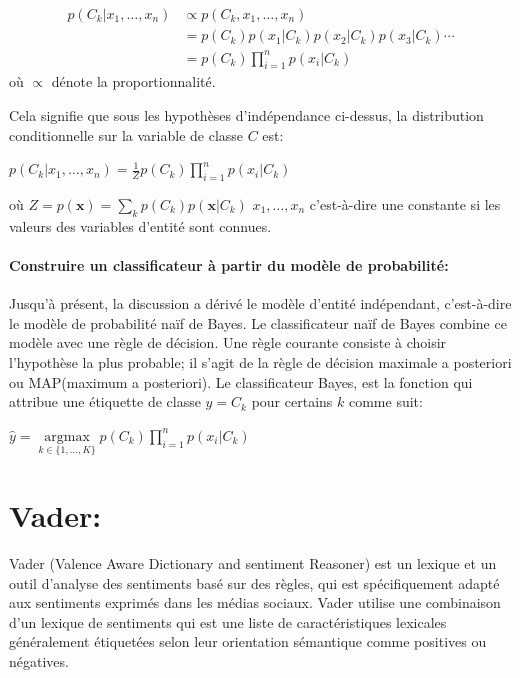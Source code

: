 \begin{equation}
    \begin{aligned}
        p\left(C_{k} | x_{1}, \ldots, x_{n}\right) & \propto p\left(C_{k}, x_{1}, \ldots, x_{n}\right)                                                               \\
                                                   & =p\left(C_{k}\right) p\left(x_{1} | C_{k}\right) p\left(x_{2} | C_{k}\right) p\left(x_{3} | C_{k}\right) \cdots \\
                                                   & =p\left(C_{k}\right) \prod_{i=1}^{n} p\left(x_{i} | C_{k}\right)
    \end{aligned}
\end{equation}
où $\propto$ dénote la proportionnalité.

Cela signifie que sous les hypothèses d'indépendance ci-dessus, la distribution conditionnelle sur la variable de classe $C$ est: 
\begin{center}
    $p\left(C_{k} | x_{1}, \ldots, x_{n}\right)=\frac{1}{Z} p\left(C_{k}\right) \prod_{i=1}^{n} p\left(x_{i} | C_{k}\right)$
\end{center}
où $Z=p(\mathbf{x})=\sum_{k} p\left(C_{k}\right) p\left(\mathbf{x} | C_{k}\right)$ $x_{1}, \ldots, x_{n}$ c'est-à-dire une constante si les valeurs des variables d'entité sont connues.
\paragraph{Construire un classificateur à partir du modèle de probabilité:}
Jusqu'à présent, la discussion a dérivé le modèle d'entité indépendant, c'est-à-dire le modèle de probabilité naïf de Bayes. Le classificateur naïf de Bayes combine ce modèle avec une règle de décision. Une règle courante consiste à choisir l'hypothèse la plus probable; il s'agit de la règle de décision maximale a posteriori ou MAP(maximum a posteriori). Le classificateur Bayes, est la fonction qui attribue une étiquette de classe ${\displaystyle {\hat{y}} = C_ {k}}$ pour certains $k$ comme suit: \\
\begin{center}
    $\hat{y}=\underset{k \in\{1, \ldots, K\}}{\operatorname{argmax}} p\left(C_{k}\right) \prod_{i=1}^{n} p\left(x_{i} | C_{k}\right)$
\end{center}


\section{Vader:}
Vader (Valence Aware Dictionary and sentiment Reasoner) est un lexique et un outil d'analyse des sentiments basé sur des règles, qui est spécifiquement adapté aux sentiments exprimés dans les médias sociaux. Vader utilise une combinaison d'un lexique de sentiments qui est une liste de caractéristiques lexicales généralement étiquetées selon leur orientation sémantique comme positives ou négatives.

